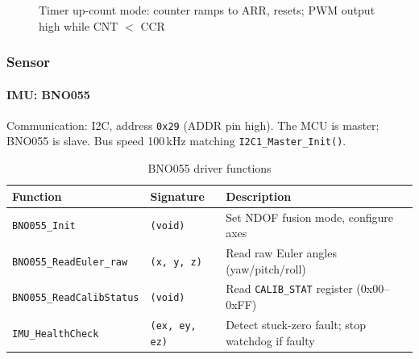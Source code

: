 \documentclass[12pt,a4paper]{article}
\begin{document}
\begin{figure}[h]
\centering
{}
\caption{Timer up-count mode: counter ramps to ARR, resets; PWM output high while CNT $<$ CCR}
\end{figure}

\subsubsection{Sensor}

\paragraph{IMU: BNO055}

Communication: I2C, address \texttt{0x29} (ADDR pin high).
The MCU is master; BNO055 is slave. Bus speed 100\,kHz matching \texttt{I2C1\_Master\_Init()}.

\begin{table}[H]
\centering
\begin{tabular}{lll}
\hline
\textbf{Function} & \textbf{Signature} & \textbf{Description} \\
\hline
\texttt{BNO055\_Init}          & \texttt{(void)}          & Set NDOF fusion mode, configure axes \\
\texttt{BNO055\_ReadEuler\_raw}& \texttt{(x, y, z)}       & Read raw Euler angles (yaw/pitch/roll) \\
\texttt{BNO055\_ReadCalibStatus} & \texttt{(void)}        & Read \texttt{CALIB\_STAT} register (0x00--0xFF) \\
\texttt{IMU\_HealthCheck}      & \texttt{(ex, ey, ez)}    & Detect stuck-zero fault; stop watchdog if faulty \\
\hline
\end{tabular}
\caption{BNO055 driver functions}
\end{table}
\end{document}
